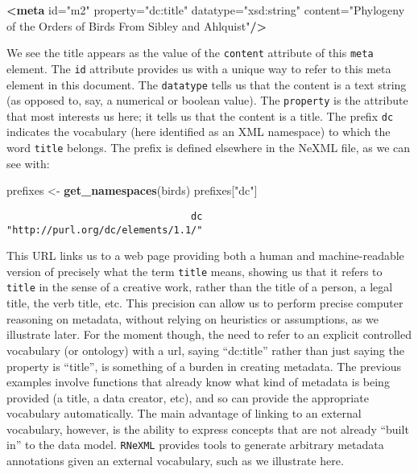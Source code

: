 \documentclass[author-year, review, 11pt]{components/elsarticle} %
\newenvironment{Shaded}{\begin{snugshade}}{\end{snugshade}}
\newcommand{\KeywordTok}[1]{\textcolor[rgb]{0.13,0.29,0.53}{\textbf{{#1}}}}
\newcommand{\StringTok}[1]{\textcolor[rgb]{0.31,0.60,0.02}{{#1}}}
\newcommand{\OtherTok}[1]{\textcolor[rgb]{0.56,0.35,0.01}{{#1}}}
\newcommand{\NormalTok}[1]{{#1}}
\begin{document}
\begin{Shaded}
\begin{Highlighting}[]
\KeywordTok{<meta}\OtherTok{ id=}\StringTok{"m2"}\OtherTok{ property=}\StringTok{"dc:title"}\OtherTok{ datatype=}\StringTok{"xsd:string"}
\OtherTok{      content=}\StringTok{"Phylogeny of the Orders of Birds From Sibley and Ahlquist"}\KeywordTok{/>} 
\end{Highlighting}
\end{Shaded}

We see the title appears as the value of the \texttt{content} attribute
of this \texttt{meta} element. The \texttt{id} attribute provides us
with a unique way to refer to this meta element in this document. The
\texttt{datatype} tells us that the content is a text string (as opposed
to, say, a numerical or boolean value). The \texttt{property} is the
attribute that most interests us here; it tells us that the content is a
title. The prefix \texttt{dc} indicates the vocabulary (here identified
as an XML namespace) to which the word \texttt{title} belongs. The
prefix is defined elsewhere in the NeXML file, as we can see with:

\begin{Shaded}
\begin{Highlighting}[]
\NormalTok{prefixes <-}\StringTok{ }\KeywordTok{get_namespaces}\NormalTok{(birds)}
\NormalTok{prefixes[}\StringTok{"dc"}\NormalTok{]}
\end{Highlighting}
\end{Shaded}

\begin{verbatim}
                                dc 
"http://purl.org/dc/elements/1.1/" 
\end{verbatim}

This URL links us to a web page providing both a human and
machine-readable version of precisely what the term \texttt{title}
means, showing us that it refers to \texttt{title} in the sense of a
creative work, rather than the title of a person, a legal title, the
verb title, etc. This precision can allow us to perform precise computer
reasoning on metadata, without relying on heuristics or assumptions, as
we illustrate later. For the moment though, the need to refer to an
explicit controlled vocabulary (or ontology) with a url, saying
``dc:title'' rather than just saying the property is ``title'', is
something of a burden in creating metadata. The previous examples
involve functions that already know what kind of metadata is being
provided (a title, a data creator, etc), and so can provide the
appropriate vocabulary automatically. The main advantage of linking to
an external vocabulary, however, is the ability to express concepts that
are not already ``built in'' to the data model. \texttt{RNeXML} provides
tools to generate arbitrary metadata annotations given an external
vocabulary, such as we illustrate here.
\end{document}
